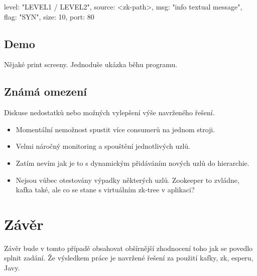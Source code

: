\documentclass[
  digital, %
  table,   %
  nolof,     %
  nolot,     %
  twoside, %
  nocover,
  monochrome,
  12pt
]{fithesis3}
\begin{document}
\begin{center}
\begin{minipage}[H]{.65\linewidth}
	\begin{mylisting}
	{
		level: "LEVEL1 / LEVEL2",
		source: <zk-path>,
		msg: "info textual message",
		flag: "SYN",
		size: 10,
		port: 80
	}
	\end{mylisting}
	\label{fig:data-example-2} 
\end{minipage}
\end{center}

\section{Demo}
Nějaké print screeny. Jednoduše ukázka běhu programu.
\section{Známá omezení}
Diskuse nedostatků nebo možných vylepšení výše navrženého řešení. 
\begin{itemize}
	\item Momentální nemožnost spustit více consumerů na jednom stroji.
	\item Velmi náročný monitoring a spouštění jednotlivých uzlů.
	\item Zatím nevím jak je to s dynamickým přidáváním nových uzlů do hierarchie.
	\item Nejsou vůbec otestovány výpadky některých uzlů. Zookeeper to zvládne, kafka také, ale co se stane s virtuálním zk-tree v aplikaci?
\end{itemize}

\chapter{Závěr}
Závěr bude v tomto případě obsahovat obšírnější zhodnocení toho jak se povedlo splnit zadání. Že výsledkem práce je navržené řešení za použití kafky, zk, esperu, Javy.
\end{document}
